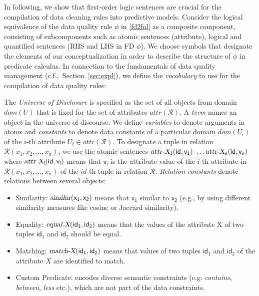 In following, we show that first-order logic sentences are crucial for the compilation of data cleaning rules into predictive models. Consider the logical equivalence of the data quality rule $\phi$ in \ref{fd2fol} as a composite component, consisting of subcomponents such as atomic sentences (attribute), logical and quantified sentences (RHS and LHS in FD $\phi$). We choose symbols that designate the elements of our conceptualization in order to describe the structure of $\phi$ in predicate calculus. In connection to the fundamentals of data quality management (c.f.,~Section~\ref{sec:expl}), we define the \textit{vocabulary} to use for the compilation of data quality rules: 

The \textit{Universe of Disclosure} is specified as the set of all objects from domain $dom(U)$ that is fixed for the set of attributes $attr(\mathcal{R})$. A \textit{term} names an object in the universe of discourse. We define \textit{variables} to denote arguments in atoms and \textit{constants} to denote data constants of a particular domain $dom(U_i)$ of the $i$-th attribute $U_i \in attr(\mathcal{R})$. To designate a tuple in relation %
$\mathcal{R}(x_1,x_2, \dots , x_n)$, we use the atomic sentences $\mathsf{\textsl{attr-X}_1(id,v_1)}$ %
$\dots \mathsf{\textsl{attr-X}_n(id,v_n)}$ where $\mathsf{\textsl{attr-X}_i(id,v_i)}$ means that $\mathsf{v_i}$ is the attribute value of the $i$-th attribute in $\mathcal{R}(x_1,x_2, \dots , x_n)$ of the $id$-th tuple in relation $\mathcal{R}$. \textit{Relation constants} denote relations between several objects:
	\begin{itemize}
		\item Similarity: $\mathsf{\textsl{similar}(x_1,x_2)}$ means that $\mathsf{x_1}$ similar to $\mathsf{x_2}$ (e.g., by using different similarity measures like cosine or Jaccard similarity).
		\item Equality: $\mathsf{\textsl{equal-X}(id_1, id_2)}$ means that the values of the attribute X of two tuples $\mathsf{id_1}$ and $\mathsf{id_2}$ should be equal.
		\item Matching: $\mathsf{\textsl{match-X}(id_1, id_2)}$ means that values of two tuples $\mathsf{id_1}$ and $\mathsf{id_2}$ of the attribute $X$ are identified to match.
		\item Custom Predicate: encodes diverse semantic constraints (e.g. \textit{contains}, \textit{between}, \textit{less} etc.), which are not part of the data constraints.
	\end{itemize}

